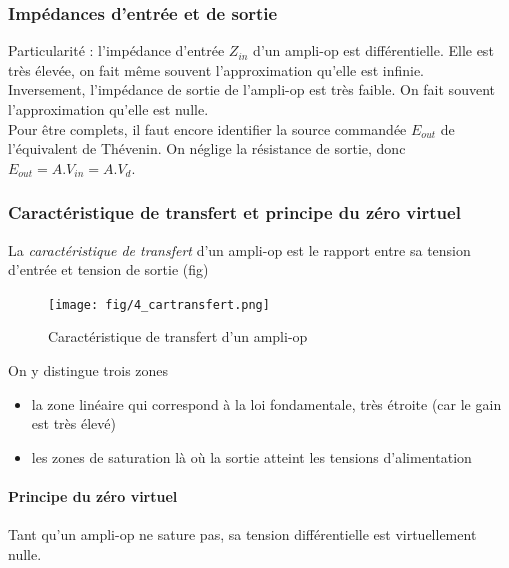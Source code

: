 \documentclass[a4paper]{article}
\begin{document}
    \subsubsection{Impédances d'entrée et de sortie}
    Particularité : l'impédance d'entrée $Z_{in}$ d'un ampli-op est différentielle.
    Elle est très élevée, on fait même souvent l'approximation qu'elle est infinie.\\

    Inversement, l'impédance de sortie de l'ampli-op est très faible. On fait
    souvent l'approximation qu'elle est nulle.\\

    Pour être complets, il faut encore identifier la source commandée $E_{out}$
    de l'équivalent de Thévenin. On néglige la résistance de sortie, donc 
    $E_{out} = A.V_{in} = A.V_d$.

    \subsubsection{Caractéristique de transfert et principe du zéro virtuel}
    La \textit{caractéristique de transfert} d'un ampli-op est le rapport entre
    sa tension d'entrée et tension de sortie (fig) 

    \begin{figure}[H]
        \begin{center}
            \texttt{[image: fig/4\_cartransfert.png]}
            \caption{Caractéristique de transfert d'un ampli-op}
            \label{fig:4_cartransfert}
        \end{center}
    \end{figure}

    On y distingue trois zones
    \begin{itemize}
        \item la zone linéaire qui correspond à la loi fondamentale, très étroite
        (car le gain est très élevé)
        \item les zones de saturation là où la sortie atteint les tensions d'alimentation
    \end{itemize}

    \paragraph{Principe du zéro virtuel} Tant qu'un ampli-op ne sature pas, sa 
    tension différentielle est virtuellement nulle.\\
\end{document}
